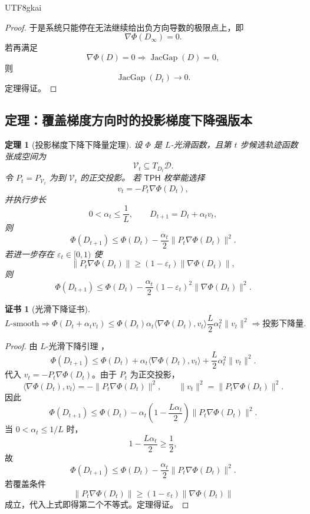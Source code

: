 \documentclass[12pt]{article}
\newtheorem{theorem}{定理}[section]
\newtheorem{Certificate}{证书}[section]
\newcommand{\TPH}{\ensuremath{\mathsf{TPH}}}
\DeclareMathOperator{\JacGap}{JacGap}
\begin{document}
\begin{CJK*}{UTF8}{gkai}
\begin{proof}
于是系统只能停在无法继续给出负方向导数的极限点上，即
\[
\nabla\Phi(D_\infty)=0.
\]
若再满足
\[
\nabla\Phi(D)=0\Longrightarrow\JacGap(D)=0,
\]
则
\[
\JacGap(D_t)\to0.
\]
定理得证。
\end{proof}

\subsection{定理：覆盖梯度方向时的投影梯度下降强版本}
\label{subsec:projected-gradient-strong-version}

\begin{theorem}[投影梯度下降下降量定理]
设 \(\Phi\) 是 \(L\)-光滑函数，且第 \(t\) 步候选轨迹函数张成空间为
\[
\mathcal V_t\subseteq T_{D_t}\mathcal D.
\]
令 \(P_t=P_{\mathcal V_t}\) 为到 \(\mathcal V_t\) 的正交投影。
若 \(\TPH\) 枚举能选择
\[
v_t=-P_t\nabla\Phi(D_t),
\]
并执行步长
\[
0<\alpha_t\le\frac1L,
\qquad
D_{t+1}=D_t+\alpha_t v_t,
\]
则
\[
\boxed{
\Phi(D_{t+1})
\le
\Phi(D_t)
-
\frac{\alpha_t}{2}
\|P_t\nabla\Phi(D_t)\|^2.
}
\]
若进一步存在 \(\varepsilon_t\in[0,1)\) 使
\[
\|P_t\nabla\Phi(D_t)\|
\ge
(1-\varepsilon_t)\|\nabla\Phi(D_t)\|,
\]
则
\[
\boxed{
\Phi(D_{t+1})
\le
\Phi(D_t)
-
\frac{\alpha_t}{2}
(1-\varepsilon_t)^2
\|\nabla\Phi(D_t)\|^2.
}
\]
\end{theorem}

\begin{Certificate}[光滑下降证书]
\[
\boxed{
L\text{-smooth}
\Rightarrow
\Phi(D_t+\alpha_t v_t)
\le
\Phi(D_t)
\alpha_t\langle\nabla\Phi(D_t),v_t\rangle
\frac L2\alpha_t^2\|v_t\|^2
\Rightarrow
\text{投影下降量}.
}
\]
\end{Certificate}

\begin{proof}
由 \(L\)-光滑下降引理 \cite{NocedalWright2006Optimization}，
\[
\Phi(D_{t+1})
\le
\Phi(D_t)
+
\alpha_t
\langle
\nabla\Phi(D_t),v_t
\rangle
+
\frac L2\alpha_t^2\|v_t\|^2.
\]
代入 \(v_t=-P_t\nabla\Phi(D_t)\)。由于 \(P_t\) 为正交投影，
\[
\langle\nabla\Phi(D_t),v_t\rangle
=
-\|P_t\nabla\Phi(D_t)\|^2,
\qquad
\|v_t\|^2=\|P_t\nabla\Phi(D_t)\|^2.
\]
因此
\[
\Phi(D_{t+1})
\le
\Phi(D_t)
-
\alpha_t
\left(
1-\frac{L\alpha_t}{2}
\right)
\|P_t\nabla\Phi(D_t)\|^2.
\]
当 \(0<\alpha_t\le1/L\) 时，
\[
1-\frac{L\alpha_t}{2}\ge\frac12,
\]
故
\[
\Phi(D_{t+1})
\le
\Phi(D_t)
-
\frac{\alpha_t}{2}
\|P_t\nabla\Phi(D_t)\|^2.
\]
若覆盖条件
\[
\|P_t\nabla\Phi(D_t)\|
\ge
(1-\varepsilon_t)\|\nabla\Phi(D_t)\|
\]
成立，代入上式即得第二个不等式。定理得证。
\end{proof}


\end{CJK*}
\end{document}
